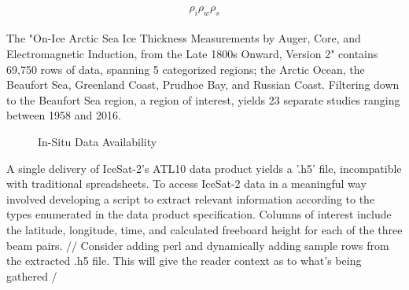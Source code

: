 \begin{equation*}
	\rho_i
	\rho_w
	\rho_s
\end{equation*}


\paragraph*{}
The "On-Ice Arctic Sea Ice Thickness Measurements by Auger, Core, and Electromagnetic Induction, from the Late 1800s Onward, Version 2" contains 69,750 rows of data, spanning 5 categorized regions; the Arctic Ocean, the Beaufort Sea, Greenland Coast, Prudhoe Bay, and Russian Coast. Filtering down to the Beaufort Sea region, a region of interest, yields 23 separate studies ranging between 1958 and 2016.
\par
\begin{figure}[htb]
	\centering
	\caption{In-Situ Data Availability}
	\label{fig:foobar}
\end{figure}


A single delivery of IceSat-2's ATL10 data product yields a '.h5' file, incompatible with traditional spreadsheets. To access IceSat-2 data in a meaningful way involved developing a script to extract relevant information according to the types enumerated in the data product specification. Columns of interest include the latitude, longitude, time, and calculated freeboard height for each of the three beam pairs.
// Consider adding perl and dynamically adding sample rows from the extracted .h5 file. This will give the reader context as to what's being gathered /

